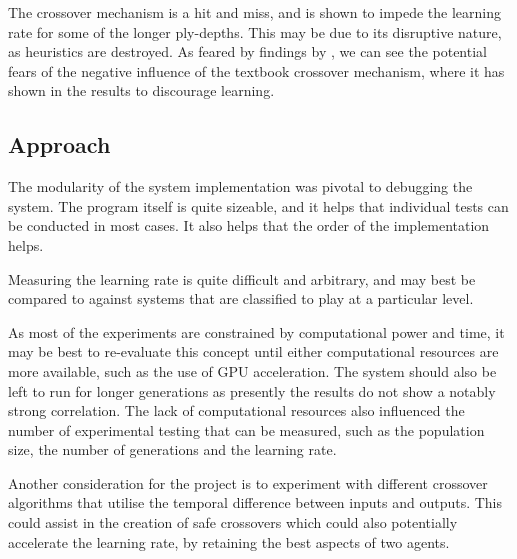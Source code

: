 \documentclass[12pt,a4paper]{article}
\begin{document}
    The crossover mechanism is a hit and miss, and is shown to impede the learning rate for some of the longer ply-depths. This may be due to its disruptive nature, as heuristics are destroyed. As feared by findings by \cite{emmanouilidis_comparison_2000}, we can see the potential fears of the negative influence of the textbook crossover mechanism, where it has shown in the results to discourage learning.


    \subsection{Approach}
        The modularity of the system implementation was pivotal to debugging the system. The program itself is quite sizeable, and it helps that individual tests can be conducted in most cases. It also helps that the order of the implementation helps.

        Measuring the learning rate is quite difficult and arbitrary, and may best be compared to against systems that are classified to play at a particular level. 

        As most of the experiments are constrained by computational power and time, it may be best to re-evaluate this concept until either computational resources are more available, such as the use of GPU acceleration. The system should also be left to run for longer generations as presently the results do not show a notably strong correlation. The lack of computational resources also influenced the number of experimental testing that can be measured, such as the population size, the number of generations and the learning rate. 
        
        Another consideration for the project is to experiment with different crossover algorithms that utilise the temporal difference between inputs and outputs. This could assist in the creation of safe crossovers which could also potentially accelerate the learning rate, by retaining the best aspects of two agents.
        
\end{document}
